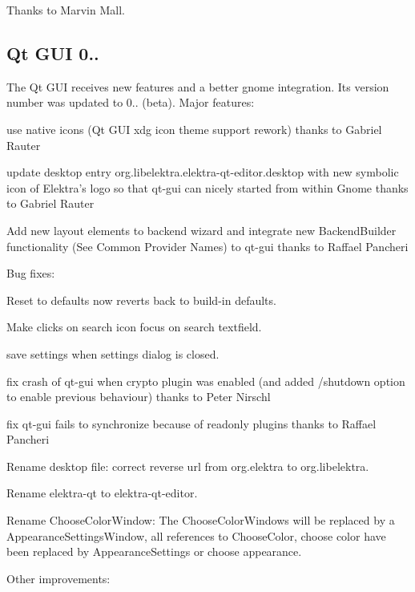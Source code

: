 Thanks to Marvin Mall.

\subsection*{Qt G\+UI 0..}

The Qt G\+UI receives new features and a better gnome integration. Its version number was updated to 0.. (beta). Major features\+:


\begin{DoxyItemize}
\item use native icons (Qt G\+UI xdg icon theme support rework) thanks to Gabriel Rauter
\item update desktop entry org.\+libelektra.\+elektra-\/qt-\/editor.\+desktop with new symbolic icon of Elektra’s logo so that qt-\/gui can nicely started from within Gnome thanks to Gabriel Rauter
\item Add new layout elements to backend wizard and integrate new Backend\+Builder functionality (See Common Provider Names) to qt-\/gui thanks to Raffael Pancheri
\end{DoxyItemize}

Bug fixes\+:


\begin{DoxyItemize}
\item Reset to defaults now reverts back to build-\/in defaults.
\item Make clicks on search icon focus on search textfield.
\item save settings when settings dialog is closed.
\item fix crash of qt-\/gui when crypto plugin was enabled (and added /shutdown option to enable previous behaviour) thanks to Peter Nirschl
\item fix qt-\/gui fails to synchronize because of readonly plugins thanks to Raffael Pancheri
\item Rename desktop file\+: correct reverse url from org.\+elektra to org.\+libelektra.
\item Rename elektra-\/qt to elektra-\/qt-\/editor.
\item Rename Choose\+Color\+Window\+: The Choose\+Color\+Windows will be replaced by a Appearance\+Settings\+Window, all references to Choose\+Color, choose color have been replaced by Appearance\+Settings or choose appearance.
\end{DoxyItemize}

Other improvements\+:


